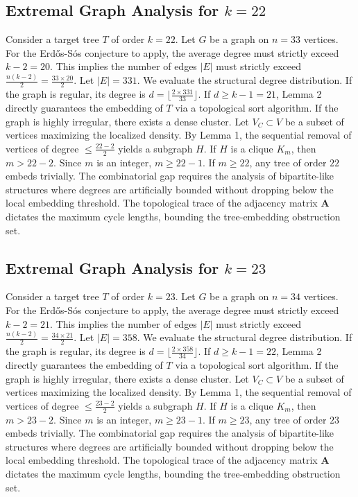 \documentclass[11pt,a4paper]{article}
\begin{document}
\subsection{Extremal Graph Analysis for $k=22$}
Consider a target tree $T$ of order $k=22$.
Let $G$ be a graph on $n=33$ vertices.
For the Erd\H{o}s-S\'os conjecture to apply, the average degree must strictly exceed $k-2 = 20$.
This implies the number of edges $|E|$ must strictly exceed $\frac{n(k-2)}{2} = \frac{33 \times 20}{2}$.
Let $|E| = 331$.
We evaluate the structural degree distribution. If the graph is regular, its degree is $d = \lfloor \frac{2 \times 331}{33} \rfloor$.
If $d \geq k-1 = 21$, Lemma 2 directly guarantees the embedding of $T$ via a topological sort algorithm.
If the graph is highly irregular, there exists a dense cluster. Let $V_C \subset V$ be a subset of vertices maximizing the localized density.
By Lemma 1, the sequential removal of vertices of degree $\leq \frac{22-2}{2}$ yields a subgraph $H$.
If $H$ is a clique $K_{m}$, then $m > 22-2$. Since $m$ is an integer, $m \geq 22-1$. If $m \geq 22$, any tree of order $22$ embeds trivially.
The combinatorial gap requires the analysis of bipartite-like structures where degrees are artificially bounded without dropping below the local embedding threshold. The topological trace of the adjacency matrix $\mathbf{A}$ dictates the maximum cycle lengths, bounding the tree-embedding obstruction set.


\subsection{Extremal Graph Analysis for $k=23$}
Consider a target tree $T$ of order $k=23$.
Let $G$ be a graph on $n=34$ vertices.
For the Erd\H{o}s-S\'os conjecture to apply, the average degree must strictly exceed $k-2 = 21$.
This implies the number of edges $|E|$ must strictly exceed $\frac{n(k-2)}{2} = \frac{34 \times 21}{2}$.
Let $|E| = 358$.
We evaluate the structural degree distribution. If the graph is regular, its degree is $d = \lfloor \frac{2 \times 358}{34} \rfloor$.
If $d \geq k-1 = 22$, Lemma 2 directly guarantees the embedding of $T$ via a topological sort algorithm.
If the graph is highly irregular, there exists a dense cluster. Let $V_C \subset V$ be a subset of vertices maximizing the localized density.
By Lemma 1, the sequential removal of vertices of degree $\leq \frac{23-2}{2}$ yields a subgraph $H$.
If $H$ is a clique $K_{m}$, then $m > 23-2$. Since $m$ is an integer, $m \geq 23-1$. If $m \geq 23$, any tree of order $23$ embeds trivially.
The combinatorial gap requires the analysis of bipartite-like structures where degrees are artificially bounded without dropping below the local embedding threshold. The topological trace of the adjacency matrix $\mathbf{A}$ dictates the maximum cycle lengths, bounding the tree-embedding obstruction set.
\end{document}

